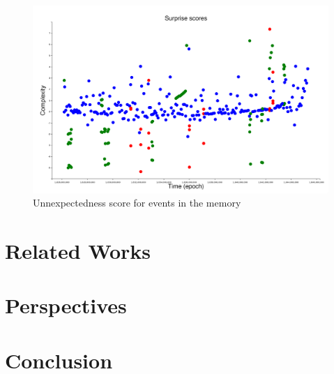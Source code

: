 \documentclass[conference]{IEEEtran}
\begin{document}
\begin{figure}[ht]
  \centering
  \includegraphics[width=\linewidth]{figures/surprises}
  \caption{Unnexpectedness score for events in the memory}
  \label{fig:result1}
\end{figure}

\section{Related Works}
\label{sec:related}

\section{Perspectives}

\section{Conclusion}




\end{document}
